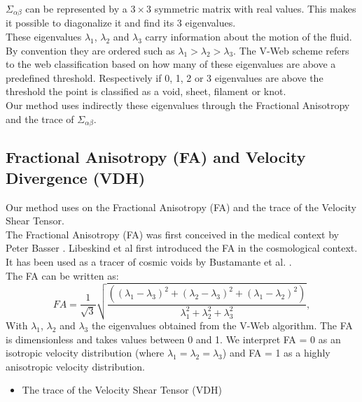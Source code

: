 \documentclass[12pt]{article}
\begin{document}
$\Sigma _{\alpha\beta}$ can be represented by a $3 \times
 3$ symmetric matrix with real values. This makes it
  possible to diagonalize it and find its 3 eigenvalues.\\
These eigenvalues $\lambda_1$, $\lambda_2$ and
 $\lambda_3$ carry information about the motion of the
 fluid. By convention they are ordered such as
  $\lambda_1 > \lambda_2 >\lambda_3$. The V-Web scheme
   refers to the web classification based on how many of
    these eigenvalues are above a predefined threshold.
     Respectively if 0, 1, 2 or 3 eigenvalues are above
      the threshold the point is classified as a void,
       sheet, filament or knot. \\
       
Our method uses indirectly these eigenvalues through the
 Fractional Anisotropy and the trace of 
 $\Sigma _{\alpha\beta}$.


\subsection{Fractional Anisotropy (FA) and Velocity Divergence (VDH)}
\label{sec:FA_trace}

Our method uses on the Fractional Anisotropy (FA) and the trace of the Velocity Shear Tensor.\\


The Fractional Anisotropy (FA) was first conceived in the
 medical context by Peter Basser
  \cite{basser_inferring_1995}. Libeskind et al
   \cite{libeskind_velocity_2013} first introduced the FA
    in the cosmological context. It has been used as
    a tracer of cosmic voids by Bustamante et al.
     \cite{bustamante_tensor_2015}.\\
    
The FA can be written as:
\[
FA = \frac{1}{\sqrt{3}} \sqrt{\frac{( \left( \lambda_1 - \lambda_3 \right)^2 + \left( \lambda_2 - \lambda_3 \right)^2 + \left( \lambda_1 - \lambda_2 \right)^2  )}{\lambda^{2}_1 + \lambda^{2}_2 + \lambda^{2}_3}} ,
\]
With $\lambda_1$, $\lambda_2$ and $\lambda_3$ the
 eigenvalues obtained from the V-Web algorithm. The FA is
  dimensionless and takes values between 0 and
   1. We
  interpret FA = 0 as an isotropic velocity distribution (where $\lambda_1 = \lambda_2 =
    \lambda_3$) and FA = 1 as a highly anisotropic
     velocity distribution. 

\begin{itemize}
\item The trace of the Velocity Shear Tensor (VDH)
\end{itemize}
\end{document}

